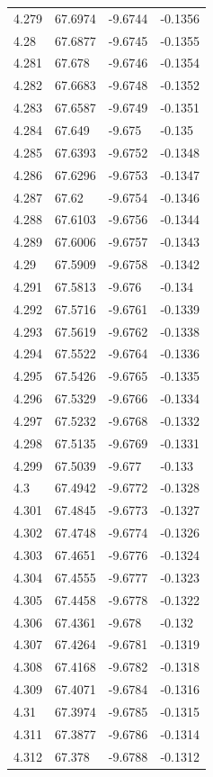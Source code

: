 \begin{tabular}{llll}
4.279 & 67.6974 & -9.6744 & -0.1356 \\
4.28 & 67.6877 & -9.6745 & -0.1355 \\
4.281 & 67.678 & -9.6746 & -0.1354 \\
4.282 & 67.6683 & -9.6748 & -0.1352 \\
4.283 & 67.6587 & -9.6749 & -0.1351 \\
4.284 & 67.649 & -9.675 & -0.135 \\
4.285 & 67.6393 & -9.6752 & -0.1348 \\
4.286 & 67.6296 & -9.6753 & -0.1347 \\
4.287 & 67.62 & -9.6754 & -0.1346 \\
4.288 & 67.6103 & -9.6756 & -0.1344 \\
4.289 & 67.6006 & -9.6757 & -0.1343 \\
4.29 & 67.5909 & -9.6758 & -0.1342 \\
4.291 & 67.5813 & -9.676 & -0.134 \\
4.292 & 67.5716 & -9.6761 & -0.1339 \\
4.293 & 67.5619 & -9.6762 & -0.1338 \\
4.294 & 67.5522 & -9.6764 & -0.1336 \\
4.295 & 67.5426 & -9.6765 & -0.1335 \\
4.296 & 67.5329 & -9.6766 & -0.1334 \\
4.297 & 67.5232 & -9.6768 & -0.1332 \\
4.298 & 67.5135 & -9.6769 & -0.1331 \\
4.299 & 67.5039 & -9.677 & -0.133 \\
4.3 & 67.4942 & -9.6772 & -0.1328 \\
4.301 & 67.4845 & -9.6773 & -0.1327 \\
4.302 & 67.4748 & -9.6774 & -0.1326 \\
4.303 & 67.4651 & -9.6776 & -0.1324 \\
4.304 & 67.4555 & -9.6777 & -0.1323 \\
4.305 & 67.4458 & -9.6778 & -0.1322 \\
4.306 & 67.4361 & -9.678 & -0.132 \\
4.307 & 67.4264 & -9.6781 & -0.1319 \\
4.308 & 67.4168 & -9.6782 & -0.1318 \\
4.309 & 67.4071 & -9.6784 & -0.1316 \\
4.31 & 67.3974 & -9.6785 & -0.1315 \\
4.311 & 67.3877 & -9.6786 & -0.1314 \\
4.312 & 67.378 & -9.6788 & -0.1312 \\

\end{tabular}
